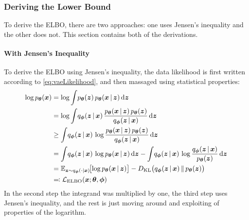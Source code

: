 			\subsubsection{Deriving the Lower Bound}
				To derive the ELBO, there are two approaches: one uses Jensen's inequality and the other does not. This section contains both of the derivations.

				\paragraph{With Jensen's Inequality}
					To derive the ELBO using Jensen's inequality, the data likelihood is first written according to \eqref{eq:vaeLikelihood}, and then massaged using statistical properties:
					\begin{align}
						\log p_{\bm{\theta}}(\bm{x})
						 & = \log \int\! p_{\bm{\theta}}(\bm{z}) \, p_{\bm{\theta}}(\bm{x} \,\vert\, \bm{z}) \dd{\bm{z}}                                                                                                                                                            \\
						 & = \log \int\! q_{\bm{\phi}}(\bm{z} \,\vert\, \bm{x}) \, \frac{p_{\bm{\theta}}(\bm{x} \,\vert\, \bm{z}) \, p_{\bm{\theta}}(\bm{z})}{q_{\bm{\phi}}(\bm{z} \,\vert\, \bm{x})} \dd{\bm{z}}                                                                   \\
						 & \geq \int\! q_{\bm{\phi}}(\bm{z} \,\vert\, \bm{x}) \, \log \frac{p_{\bm{\theta}}(\bm{x} \,\vert\, \bm{z}) \, p_{\bm{\theta}}(\bm{z})}{q_{\bm{\phi}}(\bm{z} \,\vert\, \bm{x})} \dd{\bm{z}}                                                                \\
						 & = \int\! q_{\bm{\phi}}(\bm{z} \,\vert\, \bm{x}) \, \log p_{\bm{\theta}}(\bm{x} \,\vert\, \bm{z}) \dd{\bm{z}} - \int\! q_{\bm{\phi}}(\bm{z} \,\vert\, \bm{x}) \, \log \frac{q_{\bm{\phi}}(\bm{z} \,\vert\, \bm{x})}{p_{\bm{\theta}}(\bm{z})} \dd{\bm{z}} \\
						 & = \mathbb{E}_{\bm{z} \sim q_{\bm{\phi}}(\cdot \vert \bm{x})}\!\big[\! \log p_{\bm{\theta}}(\bm{x} \,\vert\, \bm{z}) \big] - D_\mathrm{KL}\big( q_{\bm{\phi}}(\bm{z} \,\vert\, \bm{x}) \,\Vert\, p_{\bm{\theta}}(\bm{z}) \big)                              \\
						 & \eqqcolon \mathcal{L}_\mathrm{ELBO}(\bm{x}; \bm{\theta}, \bm{\phi})
					\end{align}
					In the second step the integrand was multiplied by one, the third step uses Jensen's inequality, and the rest is just moving around and exploiting of properties of the logarithm.

